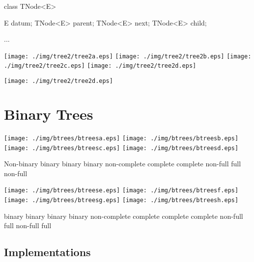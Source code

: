 \documentclass[a4paper, 9pt]{extarticle}
\begin{document}
\begin{blackboard}
class TNode<E> {
    E datum;
    TNode<E> parent;
    TNode<E> next;
    TNode<E> child;

    ...
}
\end{blackboard}

\texttt{[image: ./img/tree2/tree2a.eps]}
\texttt{[image: ./img/tree2/tree2b.eps]}
\texttt{[image: ./img/tree2/tree2c.eps]}
\texttt{[image: ./img/tree2/tree2d.eps]}

\begin{center}
\texttt{[image: ./img/tree2/tree2d.eps]}
\end{center}











\newpage


\section{Binary Trees}



\texttt{[image: ./img/btrees/btreesa.eps]}
\texttt{[image: ./img/btrees/btreesb.eps]}
\texttt{[image: ./img/btrees/btreesc.eps]}
\texttt{[image: ./img/btrees/btreesd.eps]}

\begin{blackboard}
Non-binary               binary                   binary                   binary
                         non-complete             complete                 complete
                         non-full                 full                     non-full
\end{blackboard}

\texttt{[image: ./img/btrees/btreese.eps]}
\texttt{[image: ./img/btrees/btreesf.eps]}
\texttt{[image: ./img/btrees/btreesg.eps]}
\texttt{[image: ./img/btrees/btreesh.eps]}

\begin{blackboard}
binary                   binary                   binary                   binary
non-complete             complete                 complete                 complete
non-full                 full                     non-full                 full
\end{blackboard}



\subsection{Implementations}
\end{document}
